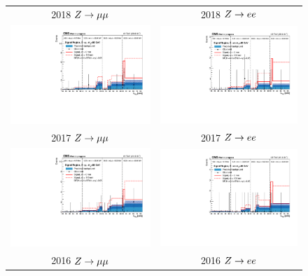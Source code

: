 \begin{figure}[htb!]
	\centering
	\begin{tabular}{c c}
		2018 $Z\to\mu\mu$ & 2018 $Z\to ee$\\
		\includegraphics[width=0.45\linewidth]{figs/05_analysis/closure_ZH_MU_m50_data_2018.pdf} &
		\includegraphics[width=0.45\linewidth]{figs/05_analysis/closure_ZH_ELE_m50_data_2018.pdf} \\
		2017 $Z\to\mu\mu$ & 2017 $Z\to ee$\\
		\includegraphics[width=0.45\linewidth]{figs/05_analysis/closure_ZH_MU_m50_data_2017.pdf} &
		\includegraphics[width=0.45\linewidth]{figs/05_analysis/closure_ZH_ELE_m50_data_2017.pdf} \\
		2016 $Z\to\mu\mu$ & 2016 $Z\to ee$\\

\end{tabular}
\end{figure}

